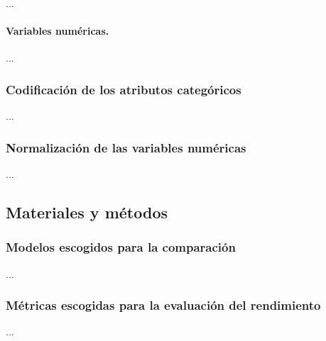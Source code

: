 ...

\paragraph*{Variables numéricas.}

...


\subsubsection{Codificación de los atributos categóricos}

...


\subsubsection{Normalización de las variables numéricas}

...


\subsection{Materiales y métodos}

\subsubsection{Modelos escogidos para la comparación}

...


\subsubsection{Métricas escogidas para la evaluación del rendimiento}

...

